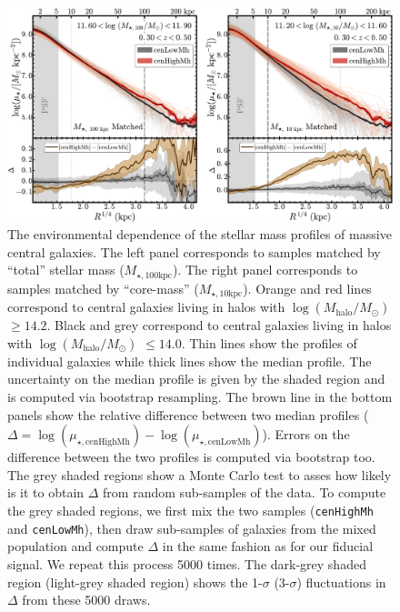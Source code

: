 \documentclass[a4paper,fleqn,usenatbib]{mnras}
\def\rbcg{\texttt{cenHighMh}}
\def\nbcg{\texttt{cenLowMh}}
\def\logmh{{$\log (M_{\mathrm{halo}}/M_{\odot})$}}
\def\minn{{$M_{\star,10\mathrm{kpc}}$}}
\def\mtot{{$M_{\star,100\mathrm{kpc}}$}}
\begin{document}
  \begin{figure}
      \centering 
      \includegraphics[width=\textwidth]{fig/redbcg_prof_1}
      \caption{
          The environmental dependence of the stellar mass profiles of massive central 
          galaxies. 
          The left panel corresponds to samples matched by ``total'' stellar mass 
          (\mtot{}). 
          The right panel corresponds to samples matched by ``core-mass'' (\minn{}). 
          Orange and red lines correspond to central galaxies living in halos with 
          \logmh{} $\geq 14.2$. 
          Black and grey correspond to central galaxies living in halos with 
          \logmh{} $\leq 14.0$. 
          Thin lines show the profiles of individual galaxies while thick lines show 
          the median profile. 
          The uncertainty on the median profile is given by the shaded region and is 
          computed via bootstrap resampling. 
          The brown line in the bottom panels show the relative difference between 
          two median profiles 
          ($\Delta = \log(\mu_{\star, \mathrm{cenHighMh}}) - 
          \log(\mu_{\star, \mathrm{cenLowMh}})$). 
          Errors on the difference between the two profiles is computed via bootstrap 
          too. 
          The grey shaded regions show a Monte Carlo test to asses how likely is it to 
          obtain $\Delta$ from random sub-samples of the data. 
          To compute the grey shaded regions, we first mix the two samples 
          (\rbcg{} and \nbcg{}), then draw sub-samples of galaxies from the mixed 
          population and compute $\Delta$ in the same fashion as for our fiducial signal. 
          We repeat this process 5000 times.  
          The dark-grey shaded region (light-grey shaded region) shows the 1-$\sigma$ 
          (3-$\sigma$) fluctuations in $\Delta$ from these 5000 draws.
          }
      \label{fig:prof_1} 
  \end{figure}
\end{document}
